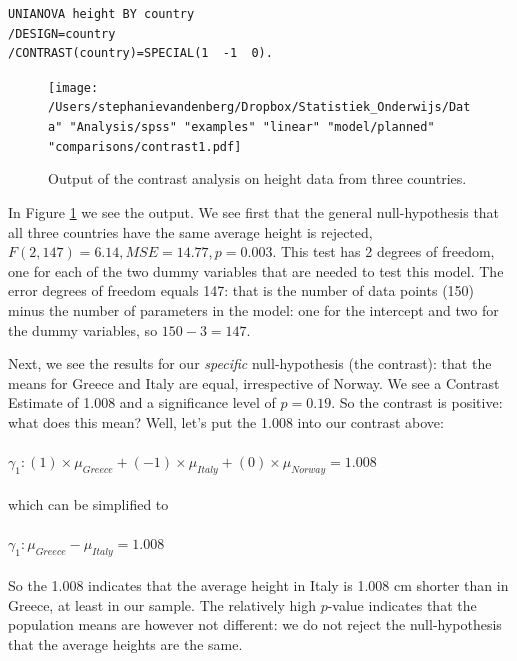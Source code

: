 \documentclass[]{book}\usepackage[]{graphicx}\usepackage[]{color}
\begin{document}
\begin{verbatim}
UNIANOVA height BY country
/DESIGN=country
/CONTRAST(country)=SPECIAL(1  -1  0).
\end{verbatim}


\begin{figure}[h]
    \begin{center}
       \texttt{[image: /Users/stephanievandenberg/Dropbox/Statistiek\_Onderwijs/Data" "Analysis/spss" "examples" "linear" "model/planned" "comparisons/contrast1.pdf]}
    \end{center}
    \caption{Output of the contrast analysis on height data from three countries.}
    \label{fig:contrast1}
\end{figure}



In Figure \ref{fig:contrast1} we see the output. We see first that the general null-hypothesis that all three countries have the same average height is rejected, $F(2, 147)= 6.14, MSE=14.77, p = 0.003$. This test has 2 degrees of freedom, one for each of the two dummy variables that are needed to test this model. The error degrees of freedom equals 147: that is the number of data points (150) minus the number of parameters in the model: one for the intercept and two for the dummy variables, so $150-3=147$.





Next, we see the results for our \textit{specific} null-hypothesis (the contrast): that the means for Greece and Italy are equal, irrespective of Norway. We see a Contrast Estimate of 1.008 and a significance level of $p=0.19$. So the contrast is positive: what does this mean? Well, let's put the 1.008 into our contrast above:
\\
\\
$\gamma_1: (1)\times \mu_{Greece} + (-1) \times \mu_{Italy} + (0) \times \mu_{Norway} = 1.008$
\\
\\
which can be simplified to
\\
\\
$\gamma_1:  \mu_{Greece} - \mu_{Italy}  =  1.008$
\\
\\
So the 1.008 indicates that the average height in Italy is 1.008 cm shorter than in Greece, at least in our sample. The relatively high $p$-value indicates that the population means are however not different: we do not reject the null-hypothesis that the average heights are the same.
\end{document}
